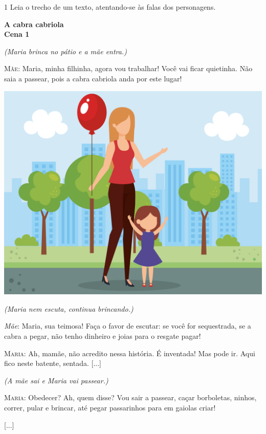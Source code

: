 \num{1} Leia o trecho de um texto, atentando-se às falas dos personagens.

\begin{myquote}
\textbf{A cabra cabriola}\\
\textbf{Cena 1}

\textit{(Maria brinca no pátio e a mãe entra.)}

\textsc{Mãe}: Maria, minha filhinha, agora vou trabalhar! Você vai ficar
quietinha. Não saia a passear, pois a cabra cabriola anda por este
lugar!

\begin{center}
\noindent\includegraphics[width=\textwidth]{./media/image3b.jpeg}
\end{center}


\textit{(Maria nem escuta, continua brincando.)}

\emph{Mãe}: Maria, sua teimosa! Faça o favor de escutar: se você for
sequestrada, se a cabra a pegar, não tenho dinheiro e joias para o
resgate pagar!

\textsc{Maria}: Ah, mamãe, não acredito nessa história. É inventada! Mas
pode ir. Aqui fico neste batente, sentada. {[}...{]}

\textit{(A mãe sai e Maria vai passear.)}

\textsc{Maria}: Obedecer? Ah, quem disse? Vou sair a passear, caçar
borboletas, ninhos, correr, pular e brincar, até pegar passarinhos para
em gaiolas criar!

{[}...{]}

\end{myquote}

